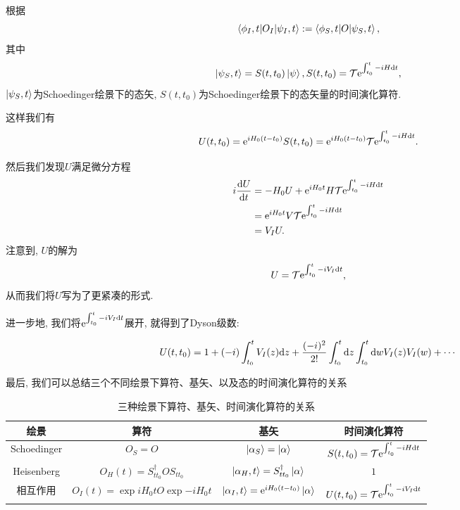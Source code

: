 根据
\begin{equation}
    \braket{\phi_I, t|O_I|\psi_I, t}:=\braket{\phi_S, t|O|\psi_S, t},
\end{equation}
其中
\begin{equation}
    \ket{\psi_S, t}=S(t, t_0)\ket\psi, S(t, t_0)=\mathcal T\mathrm e^{\int^t_{t_0}-iH\mathrm d t},
\end{equation}
$\ket{\psi_S, t}$为Schoedinger绘景下的态矢, $S(t, t_0)$为Schoedinger绘景下的态矢量的时间演化算符.

这样我们有
\begin{equation}
    U(t, t_0)=\mathrm e^{iH_0(t-t_0)}S(t, t_0)=\mathrm e^{iH_0(t-t_0)}\mathcal T\mathrm e^{\int^t_{t_0}-iH\mathrm d t}.
\end{equation}

然后我们发现$U$满足微分方程
\begin{align}
    i\frac{\mathrm dU}{\mathrm dt}&=-H_0U+\mathrm e^{iH_0t}H\mathcal T\mathrm e^{\int^t_{t_0}-iH\mathrm d t}\\
    &=\mathrm e^{iH_0t}V\mathcal T\mathrm e^{\int^t_{t_0}-iH\mathrm d t}\\
    &=V_I U.
\end{align}
注意到, $U$的解为
\begin{equation}
    U=\mathcal T\mathrm e^{\int_{t_0}^t -iV_I\mathrm d t},
\end{equation}
从而我们将$U$写为了更紧凑的形式.

进一步地, 我们将$\mathrm e^{\int_{t_0}^t -iV_I\mathrm d t}$展开, 就得到了Dyson级数:
\begin{theorem}[Dyson级数]
    \begin{equation}
        U(t, t_0)=1+(-i)\int_{t_0}^tV_I(z)\mathrm d z+\frac{(-i)^2}{2!}\int_{t_0}^t\mathrm d z\int_{t_0}^t\mathrm d w V_I(z)V_I(w) + \cdots
    \end{equation}
\end{theorem}

最后, 我们可以总结三个不同绘景下算符、基矢、以及态的时间演化算符的关系
\begin{table}[!htbp]
    \begin{tabular}{c|c|c|c}
        绘景 & 算符 & 基矢 & 时间演化算符\\
        \hline
        Schoedinger & $O_S=O$ & $\ket{\alpha_S}=\ket{\alpha}$ & $S(t, t_0)=\mathcal T\mathrm e^{\int^t_{t_0}-iH\mathrm d t}$\\
        \hline
        Heisenberg & $O_H(t)=S^\dagger_{tt_0}OS_{tt_0}$ & $\ket{\alpha_H, t}=S^\dagger_{tt_0}\ket{\alpha}$ & $1$ \\
        \hline
        相互作用 & $O_I(t)=\exp{iH_0t}O\exp{-iH_0t}$ & $\ket{\alpha_I, t}=\mathrm e^{iH_0(t-t_0)}\ket{\alpha}$ & $U(t, t_0)=\mathcal T\mathrm e^{\int_{t_0}^t -iV_I\mathrm d t}$
    \end{tabular}
    \caption{三种绘景下算符、基矢、时间演化算符的关系}
    \label{tab:threepictures}
\end{table}

